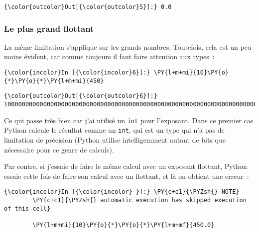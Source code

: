 \begin{Verbatim}[commandchars=\\\{\}]
{\color{outcolor}Out[{\color{outcolor}5}]:} 0.0
\end{Verbatim}
            
    \hypertarget{le-plus-grand-flottant}{%
\subsubsection{Le plus grand flottant}\label{le-plus-grand-flottant}}

    La même limitation s'applique sur les grands nombres. Toutefois, cela
est un peu moins évident, car comme toujours il faut faire attention aux
types~:

    \begin{Verbatim}[commandchars=\\\{\}]
{\color{incolor}In [{\color{incolor}6}]:} \PY{l+m+mi}{10}\PY{o}{*}\PY{o}{*}\PY{l+m+mi}{450}
\end{Verbatim}


\begin{Verbatim}[commandchars=\\\{\}]
{\color{outcolor}Out[{\color{outcolor}6}]:} 1000000000000000000000000000000000000000000000000000000000000000000000000000000000000000000000000000000000000000000000000000000000000000000000000000000000000000000000000000000000000000000000000000000000000000000000000000000000000000000000000000000000000000000000000000000000000000000000000000000000000000000000000000000000000000000000000000000000000000000000000000000000000000000000000000000000000000000000000000000000000000000000000000000000000000000
\end{Verbatim}
            
    Ce qui passe très bien car j'ai utilisé un \texttt{int} pour l'exposant.
Dans ce premier cas Python calcule le résultat comme un \texttt{int},
qui est un type qui n'a pas de limitation de précision (Python utilise
intelligemment autant de bits que nécessaire pour ce genre de calculs).

Par contre, si j'essaie de faire le même calcul avec un exposant
flottant, Python essaie cette fois de faire son calcul avec un flottant,
et là on obtient une erreur~:

    \begin{Verbatim}[commandchars=\\\{\}]
{\color{incolor}In [{\color{incolor} }]:} \PY{c+c1}{\PYZsh{} NOTE}
        \PY{c+c1}{\PYZsh{} automatic execution has skipped execution of this cell}
        
        \PY{l+m+mi}{10}\PY{o}{*}\PY{o}{*}\PY{l+m+mf}{450.0}
\end{Verbatim}


